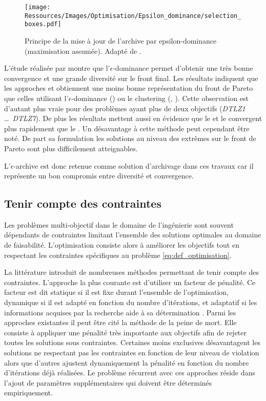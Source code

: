 \begin{figure}
    \centering
    \texttt{[image: Ressources/Images/Optimisation/Epsilon\_dominance/selection\_boxes.pdf]}
    \caption{Principe de la mise à jour de l’archive par epsilon-dominance (maximisation assumée).
             Adapté de \cite{Deb2005501}.}
    \label{fig:epsilon_dominance}
\end{figure}
L’étude réalisée par \textcite{Deb2005501} montre que l’$\epsilon$-dominance permet
d’obtenir une très bonne convergence et une grande diversité sur le front final.
Les résultats indiquent que les approches  et  obtiennent une moins
bonne représentation du front de Pareto que celles utilisant l’$\epsilon$-dominance
() ou le clustering (, ).
Cette observation est d’autant plus vraie pour des problèmes ayant plus de deux
objectifs (\textit{DTLZ1} \dots\ \textit{DTLZ7}).
De plus les résultats mettent aussi en évidence que le  et le 
convergent plus rapidement que le .
Un désavantage à cette méthode peut cependant être noté. De part sa formulation
les solutions au niveau des extrêmes sur le front de Pareto sont plus difficilement
atteignables.

L’$\epsilon$-archive est donc retenue comme solution d’archivage dans ces travaux
car il représente un bon compromis entre diversité et convergence.


\subsection{Tenir compte des contraintes} %
\label{sub:tenir_compte_des_contraintes}
Les problèmes multi-objectif dans le domaine de l’ingénierie sont souvent
dépendants de contraintes limitant l’ensemble des solutions optimales au domaine
de faisabilité. L’optimisation consiste alors à améliorer les objectifs tout en
respectant les contraintes spécifiques au problème \eqref{eq:def_optimisation}.

La littérature introduit de nombreuses méthodes permettant de tenir compte des
contraintes. L’approche la plus courante est d’utiliser un facteur de pénalité. Ce facteur
est dit statique si il est fixe durant l’ensemble de l’optimisation, dynamique si il est
adapté en fonction du nombre d’itérations, et adaptatif si les informations acquises par la
recherche aide à sa détermination \parencite{Coello2002}. Parmi les approches existantes il
peut être cité la méthode de la peine de mort. Elle consiste à appliquer une pénalité très
importante aux objectifs afin de rejeter toutes les solutions sous contraintes. Certaines
moins exclusives désavantagent les solutions ne respectant pas les contraintes en fonction
de leur niveau de violation alors que d’autres ajustent dynamiquement la pénalité en
fonction du nombre d’itérations déjà réalisées. Le problème récurrent avec ces approches
réside dans l’ajout de paramètres supplémentaires qui doivent être déterminés empiriquement.


